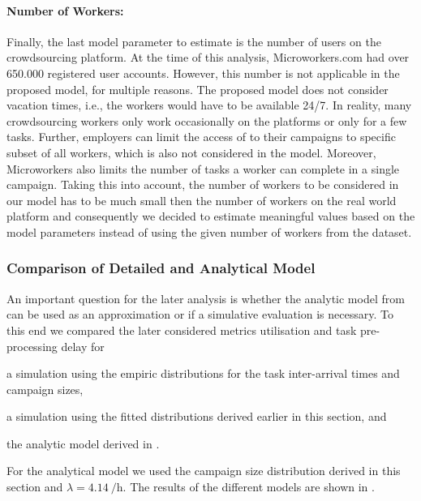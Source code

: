\paragraph*{Number of Workers: }Finally, the last model parameter to estimate is the number of users \numberOfWorkers on the crowdsourcing platform. 
At the time of this analysis, Microworkers.com had over 650.000 registered user accounts.
However, this number is not applicable in the proposed model, for multiple reasons.
The proposed model does not consider vacation times, i.e., the workers would have to be available 24/7.
In reality, many crowdsourcing workers only work occasionally on the platforms or only for a few tasks.
Further, employers can limit the access of to their campaigns to specific subset of all workers, which is also not considered in the model.
Moreover, Microworkers also limits the number of tasks a worker can complete in a single campaign.
Taking this into account, the number of workers to be considered in our model has to be much small then the number of workers on the real world platform and consequently we decided to estimate meaningful values based on the model parameters instead of using the given number of workers from the dataset.

\subsubsection*{Comparison of Detailed and Analytical Model}
An important question for the later analysis is whether the analytic model from  can be used as an approximation or if a simulative evaluation is necessary.
To this end we compared the later considered metrics utilisation \workerUtilization and task pre-processing delay \preTaskProcessingDelay for 
\begin{enumerate*}
\item a simulation using the empiric distributions for the task inter-arrival times and campaign sizes,
\item a simulation using the fitted distributions derived earlier in this section, and
\item the analytic model derived in .
\end{enumerate*}
For the analytical model we used the campaign size distribution derived in this section and \(\lambda=\SI{4.14}{\per\hour}\).
The results of the different models are shown in .

